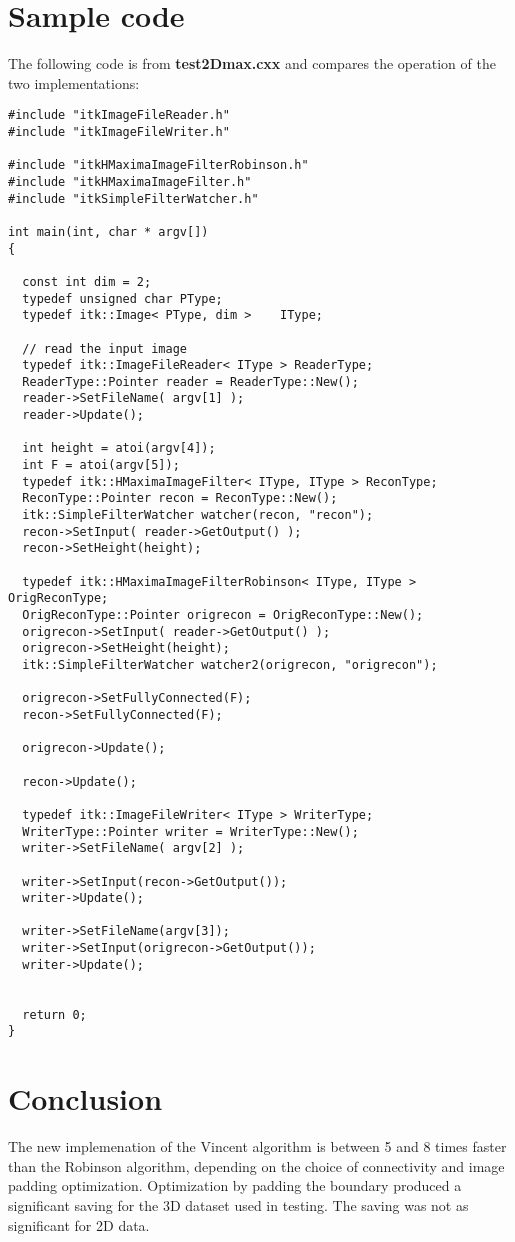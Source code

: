 \documentclass{InsightArticle}
\begin{document}
\section{Sample code}
The following code is from {\bf test2Dmax.cxx} and compares the
operation of the two implementations:
\small \begin{verbatim}
#include "itkImageFileReader.h"
#include "itkImageFileWriter.h"

#include "itkHMaximaImageFilterRobinson.h"
#include "itkHMaximaImageFilter.h"
#include "itkSimpleFilterWatcher.h"

int main(int, char * argv[])
{

  const int dim = 2;
  typedef unsigned char PType;
  typedef itk::Image< PType, dim >    IType;
  
  // read the input image
  typedef itk::ImageFileReader< IType > ReaderType;
  ReaderType::Pointer reader = ReaderType::New();
  reader->SetFileName( argv[1] );
  reader->Update();
  
  int height = atoi(argv[4]);
  int F = atoi(argv[5]);
  typedef itk::HMaximaImageFilter< IType, IType > ReconType;
  ReconType::Pointer recon = ReconType::New();
  itk::SimpleFilterWatcher watcher(recon, "recon");
  recon->SetInput( reader->GetOutput() );
  recon->SetHeight(height);
 
  typedef itk::HMaximaImageFilterRobinson< IType, IType > OrigReconType;
  OrigReconType::Pointer origrecon = OrigReconType::New();
  origrecon->SetInput( reader->GetOutput() );
  origrecon->SetHeight(height);
  itk::SimpleFilterWatcher watcher2(origrecon, "origrecon");

  origrecon->SetFullyConnected(F);
  recon->SetFullyConnected(F);
    
  origrecon->Update();

  recon->Update();

  typedef itk::ImageFileWriter< IType > WriterType;
  WriterType::Pointer writer = WriterType::New();
  writer->SetFileName( argv[2] );

  writer->SetInput(recon->GetOutput());
  writer->Update();

  writer->SetFileName(argv[3]);
  writer->SetInput(origrecon->GetOutput());
  writer->Update();
  

  return 0;
}

\end{verbatim}
\normalsize

\section{Conclusion}
The new implemenation of the Vincent algorithm is between 5 and 8
times faster than the Robinson algorithm, depending on the choice of
connectivity and image padding optimization. Optimization by padding
the boundary produced a significant saving for the 3D dataset used in
testing. The saving was not as significant for 2D data.



%

\end{document}
